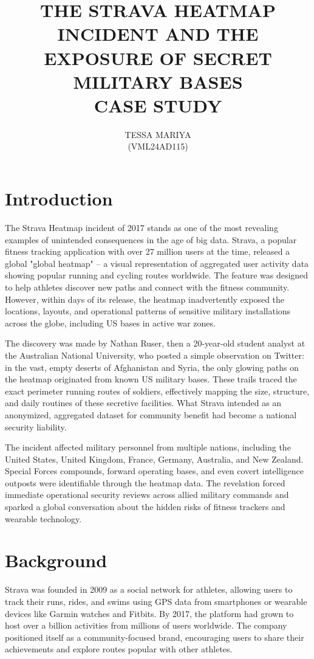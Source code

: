 \documentclass{article}
\title{THE STRAVA HEATMAP INCIDENT AND THE EXPOSURE OF SECRET MILITARY BASES \\CASE STUDY}
\author{TESSA MARIYA \\(VML24AD115)}
\date{}
\begin{document}
\maketitle

\section{Introduction}
The Strava Heatmap incident of 2017 stands as one of the most revealing examples of unintended consequences in the age of big data. Strava, a popular fitness tracking application with over 27 million users at the time, released a global "global heatmap" – a visual representation of aggregated user activity data showing popular running and cycling routes worldwide. The feature was designed to help athletes discover new paths and connect with the fitness community. However, within days of its release, the heatmap inadvertently exposed the locations, layouts, and operational patterns of sensitive military installations across the globe, including US bases in active war zones.

The discovery was made by Nathan Ruser, then a 20-year-old student analyst at the Australian National University, who posted a simple observation on Twitter: in the vast, empty deserts of Afghanistan and Syria, the only glowing paths on the heatmap originated from known US military bases. These trails traced the exact perimeter running routes of soldiers, effectively mapping the size, structure, and daily routines of these secretive facilities. What Strava intended as an anonymized, aggregated dataset for community benefit had become a national security liability.

The incident affected military personnel from multiple nations, including the United States, United Kingdom, France, Germany, Australia, and New Zealand. Special Forces compounds, forward operating bases, and even covert intelligence outposts were identifiable through the heatmap data. The revelation forced immediate operational security reviews across allied military commands and sparked a global conversation about the hidden risks of fitness trackers and wearable technology.

\section{Background}
Strava was founded in 2009 as a social network for athletes, allowing users to track their runs, rides, and swims using GPS data from smartphones or wearable devices like Garmin watches and Fitbits. By 2017, the platform had grown to host over a billion activities from millions of users worldwide. The company positioned itself as a community-focused brand, encouraging users to share their achievements and explore routes popular with other athletes.
\end{document}
